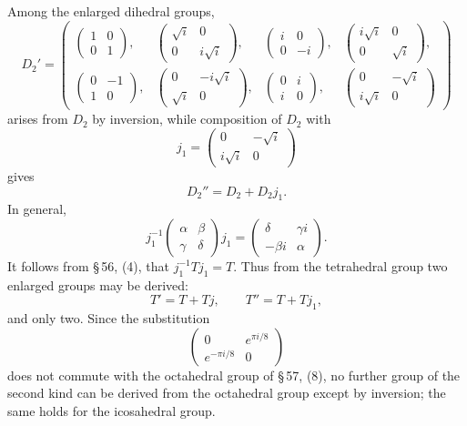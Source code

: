 \documentclass[11pt]{article}
\begin{document}
Among the enlarged dihedral groups,
\[
D_2'=\left(
\begin{array}{cccc}
\begin{pmatrix}1&0\\0&1\end{pmatrix},&
\begin{pmatrix}\sqrt i&0\\0&i\sqrt i\end{pmatrix},&
\begin{pmatrix}i&0\\0&-i\end{pmatrix},&
\begin{pmatrix}i\sqrt i&0\\0&\sqrt i\end{pmatrix},\\[0.4em]
\begin{pmatrix}0&-1\\1&0\end{pmatrix},&
\begin{pmatrix}0&-i\sqrt i\\\sqrt i&0\end{pmatrix},&
\begin{pmatrix}0&i\\i&0\end{pmatrix},&
\begin{pmatrix}0&-\sqrt i\\i\sqrt i&0\end{pmatrix}
\end{array}
\right)
\]
arises from $D_2$ by inversion, while composition of $D_2$ with
\[
 j_1=\begin{pmatrix}0&-\sqrt i\\ i\sqrt i&0\end{pmatrix}
\]
gives
\[
D_2''=D_2+D_2j_1 .
\]
In general,
\[
 j_1^{-1}\begin{pmatrix}\alpha&\beta\\ \gamma&\delta\end{pmatrix}j_1
 =
 \begin{pmatrix}\delta&\gamma i\\ -\beta i&\alpha\end{pmatrix}.
\]
It follows from \S\,56, (4), that $j_1^{-1}Tj_1=T$. Thus from the tetrahedral group two enlarged groups may be derived:
\[
T'=T+Tj,\qquad T''=T+Tj_1,
\]
and only two. Since the substitution
\[
\begin{pmatrix}0&e^{\pi i/8}\\e^{-\pi i/8}&0\end{pmatrix}
\]
does not commute with the octahedral group of \S\,57, (8), no further group of the second kind can be derived from the octahedral group except by inversion; the same holds for the icosahedral group.
\end{document}
